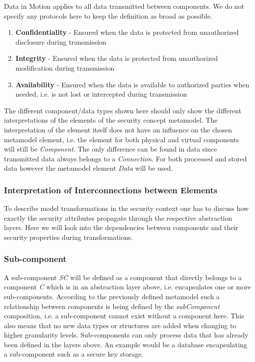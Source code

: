 Data in Motion applies to all data transmitted between components. We do not specify any protocols here to keep the definition as broad as possible.

\begin{enumerate}
\item \textbf{Confidentiality} - Ensured when the data is protected from unauthorized disclosure during transmission
\item \textbf{Integrity} - Ensured when the data is protected from unauthorized modification during transmission
\item \textbf{Availability} - Ensured when the data is available to authorized parties when needed, i.e. is not lost or intercepted during transmission 
\end{enumerate}

The different component/data types shown here should only show the different interpretations of the elements of the security concept metamodel. The interpretation of the element itself does not have an influence on the chosen metamodel element, i.e. the element for both physical and virtual components will still be \textit{Component}. The only difference can be found in data since transmitted data always belongs to a \textit{Connection}. For both processed and stored data however the metamodel element \textit{Data} will be used.

\subsubsection{Interpretation of Interconnections between Elements}

To describe model transformations in the security context one has to discuss how exactly the security attributes propagate through the respective abstraction layers. Here we will look into the dependencies between components and their security properties during transformations.

\subsubsection*{Sub-component}
\label{subsubsec:sub_comp}
A sub-component \textit{SC} will be defined as a component that directly belongs to a component \textit{C} which is in an abstraction layer above, i.e. encapsulates one or more sub-components. According to the previously defined metamodel such a relationship between components is being defined by the \textit{subComponent} composition, i.e. a sub-component cannot exist without a component here. This also means that no new data types or structures are added when changing to higher granularity levels. Sub-components can only process data that has already been defined in the layers above. An example would be a database encapsulating a sub-component such as a secure key storage.   

